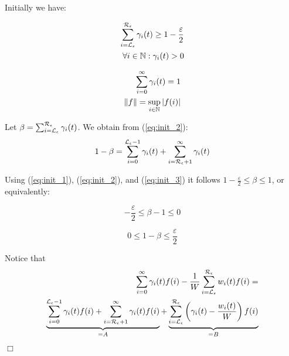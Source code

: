 \documentclass[times, 10pt,twocolumn]{article}
\newenvironment{proof}{\trivlist \item[\hskip \labelsep{\bf Proof}]}{\hfill\hbox{$\Box$}\endtrivlist}
\begin{document}
	{\small
	\begin{proof}
		Initially we have:
		
		\begin{minipage}[t]{0.45\linewidth}
			\begin{eqnarray}
				\sum_{i=\mathcal{L}_{\epsilon}}^{\mathcal{R}_{\epsilon}} \gamma_{i}(t) \geq 1 - \frac{\varepsilon}{2} \label{eq:init_1} \\
				\forall i \in \mathbb{N} : \gamma_{i}(t) > 0 \label{eq:init_3}
			\end{eqnarray}
		\end{minipage} \hfill
		\begin{minipage}[t]{0.45\linewidth}
			\begin{eqnarray}
				\sum_{i=0}^{\infty} \gamma_{i}(t) = 1 \label{eq:init_2} \\
				\|f\| = \sup_{i \in \mathbb{N}}|f(i)| \label{eq:init_4}
			\end{eqnarray}
		\end{minipage}
		
		Let $\beta = \sum_{i=\mathcal{L}_{\epsilon}}^{\mathcal{R}_{\epsilon}} \gamma_{i}(t)$.  We obtain from (\ref{eq:init_2}):
		\begin{equation}
			1 - \beta = \sum_{i = 0}^{\mathcal{L}_{\epsilon}-1} \gamma_{i}(t) + \sum_{i = \mathcal{R}_{\epsilon}+1}^{\infty} \gamma_{i}(t) \label{eq:beta_3}
		\end{equation}
		
		Using (\ref{eq:init_1}), (\ref{eq:init_2}), and (\ref{eq:init_3}) it follows $1- \frac{\varepsilon}{2} \leq \beta \leq 1$, or equivalently:

		\begin{minipage}[t]{0.45\linewidth}
			\begin{equation}
				- \frac{\varepsilon}{2} \leq \beta -1 \leq 0  \label{eq:beta_1}
			\end{equation}
		\end{minipage} \hfill
		\begin{minipage}[t]{0.45\linewidth}
			\begin{equation}
				0 \leq 1- \beta \leq \frac{\varepsilon}{2} \label{eq:beta_2}
			\end{equation}
		\end{minipage}

		Notice that
		\begin{eqnarray}
			\sum_{i=0}^{\infty} \gamma_{i}(t) f(i) - \frac{1}{W}\sum_{i = \mathcal{L}_{\epsilon}}^{\mathcal{R}_{\epsilon}} w_{i}(t) f(i) = \nonumber \\
			\underbrace{\sum_{i = 0}^{\mathcal{L}_{\epsilon}-1} \gamma_{i}(t) f(i) + \sum_{i = \mathcal{R}_{\epsilon}+1}^{\infty} \gamma_{i}(t) f(i)}_{ = A} +  
			\underbrace{\sum_{i = \mathcal{L}_{\epsilon}}^{\mathcal{R}_{\epsilon}} \left( \gamma_{i}(t) - \frac{w_{i}(t)}{W} \right) f(i)}_{ = B} \nonumber
		\end{eqnarray}
		

\end{proof}}
\end{document}
